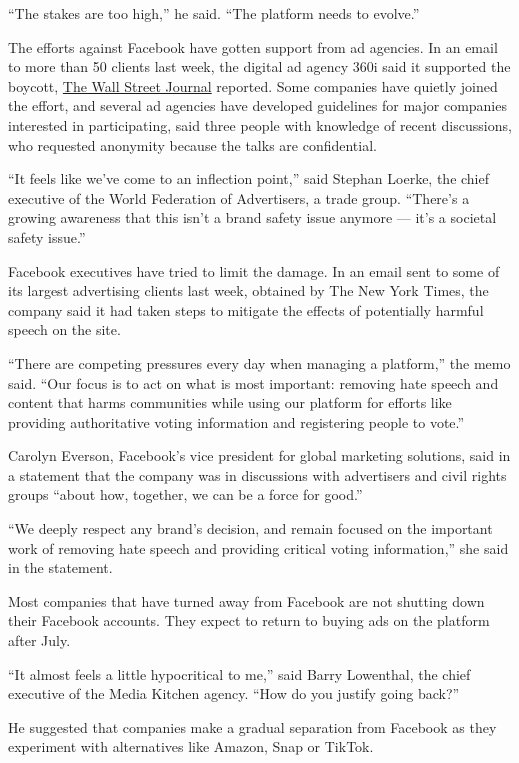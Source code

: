 ``The stakes are too high,'' he said. ``The platform needs to evolve.''

The efforts against Facebook have gotten support from ad agencies. In an
email to more than 50 clients last week, the digital ad agency 360i said
it supported the boycott,
\href{https://www.wsj.com/articles/ad-agency-encourages-clients-to-join-facebook-ad-boycott-11592517885?mod=tech_lead_pos2}{The
Wall Street Journal} reported. Some companies have quietly joined the
effort, and several ad agencies have developed guidelines for major
companies interested in participating, said three people with knowledge
of recent discussions, who requested anonymity because the talks are
confidential.

``It feels like we've come to an inflection point,'' said Stephan
Loerke, the chief executive of the World Federation of Advertisers, a
trade group. ``There's a growing awareness that this isn't a brand
safety issue anymore --- it's a societal safety issue.''

Facebook executives have tried to limit the damage. In an email sent to
some of its largest advertising clients last week, obtained by The New
York Times, the company said it had taken steps to mitigate the effects
of potentially harmful speech on the site.

``There are competing pressures every day when managing a platform,''
the memo said. ``Our focus is to act on what is most important: removing
hate speech and content that harms communities while using our platform
for efforts like providing authoritative voting information and
registering people to vote.''

Carolyn Everson, Facebook's vice president for global marketing
solutions, said in a statement that the company was in discussions with
advertisers and civil rights groups ``about how, together, we can be a
force for good.''

``We deeply respect any brand's decision, and remain focused on the
important work of removing hate speech and providing critical voting
information,'' she said in the statement.

Most companies that have turned away from Facebook are not shutting down
their Facebook accounts. They expect to return to buying ads on the
platform after July.

``It almost feels a little hypocritical to me,'' said Barry Lowenthal,
the chief executive of the Media Kitchen agency. ``How do you justify
going back?''

He suggested that companies make a gradual separation from Facebook as
they experiment with alternatives like Amazon, Snap or TikTok.

